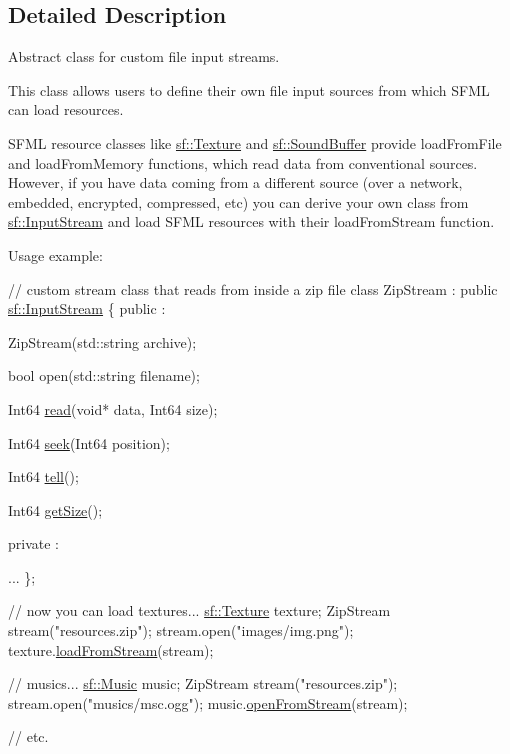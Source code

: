 \subsection{Detailed Description}
Abstract class for custom file input streams. 

This class allows users to define their own file input sources from which S\-F\-M\-L can load resources.

S\-F\-M\-L resource classes like \hyperlink{classsf_1_1Texture}{sf\-::\-Texture} and \hyperlink{classsf_1_1SoundBuffer}{sf\-::\-Sound\-Buffer} provide load\-From\-File and load\-From\-Memory functions, which read data from conventional sources. However, if you have data coming from a different source (over a network, embedded, encrypted, compressed, etc) you can derive your own class from \hyperlink{classsf_1_1InputStream}{sf\-::\-Input\-Stream} and load S\-F\-M\-L resources with their load\-From\-Stream function.

Usage example\-: 
\begin{DoxyCode}
\textcolor{comment}{// custom stream class that reads from inside a zip file}
\textcolor{keyword}{class }ZipStream : \textcolor{keyword}{public} \hyperlink{classsf_1_1InputStream}{sf::InputStream}
\{
\textcolor{keyword}{public} :

    ZipStream(std::string archive);

    \textcolor{keywordtype}{bool} open(std::string filename);

    Int64 \hyperlink{classsf_1_1InputStream_a8dd89c74c1acb693203f50e750c6ae53}{read}(\textcolor{keywordtype}{void}* data, Int64 size);

    Int64 \hyperlink{classsf_1_1InputStream_a76aba8e5d5cf9b1c5902d5e04f7864fc}{seek}(Int64 position);
    
    Int64 \hyperlink{classsf_1_1InputStream_a599515b9ccdbddb6fef5a98424fd559c}{tell}();

    Int64 \hyperlink{classsf_1_1InputStream_a311eaaaa65d636728e5153b574b72d5d}{getSize}();

\textcolor{keyword}{private} :

    ...
\};

\textcolor{comment}{// now you can load textures...}
\hyperlink{classsf_1_1Texture}{sf::Texture} texture;
ZipStream stream(\textcolor{stringliteral}{"resources.zip"});
stream.open(\textcolor{stringliteral}{"images/img.png"});
texture.\hyperlink{classsf_1_1Texture_a6803a13465a7113a8964d1081841886d}{loadFromStream}(stream);

\textcolor{comment}{// musics...}
\hyperlink{classsf_1_1Music}{sf::Music} music;
ZipStream stream(\textcolor{stringliteral}{"resources.zip"});
stream.open(\textcolor{stringliteral}{"musics/msc.ogg"});
music.\hyperlink{classsf_1_1Music_a4e55d1910a26858b44778c26b237d673}{openFromStream}(stream);

\textcolor{comment}{// etc.}
\end{DoxyCode}
 

